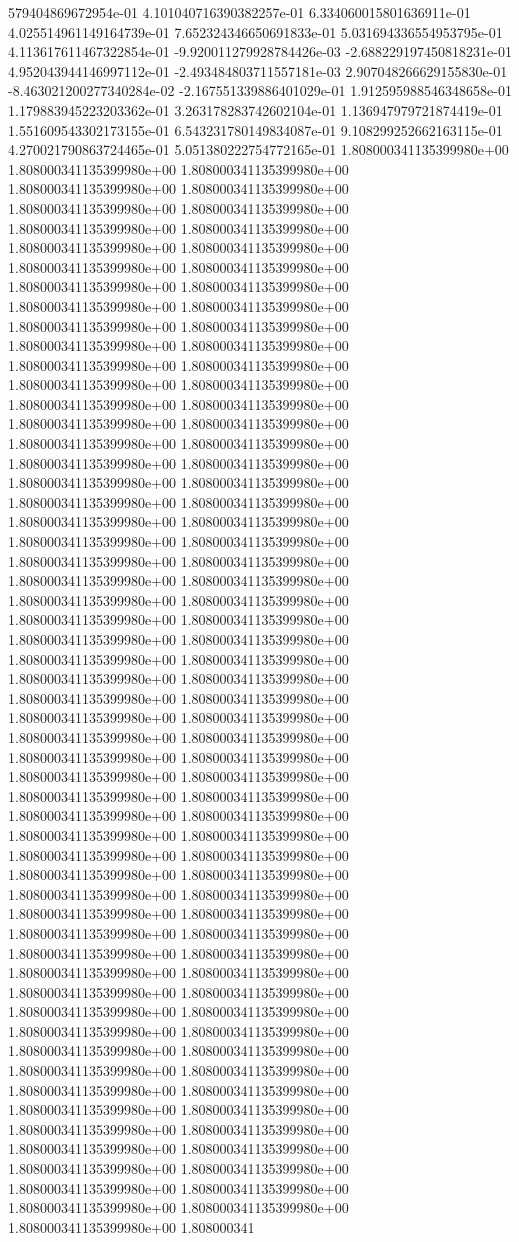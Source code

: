 579404869672954e-01	4.101040716390382257e-01	6.334060015801636911e-01	4.025514961149164739e-01	7.652324346650691833e-01	5.031694336554953795e-01	4.113617611467322854e-01	-9.920011279928784426e-03	-2.688229197450818231e-01	4.952043944146997112e-01	-2.493484803711557181e-03	2.907048266629155830e-01	-8.463021200277340284e-02	-2.167551339886401029e-01	1.912595988546348658e-01	1.179883945223203362e-01	3.263178283742602104e-01	1.136947979721874419e-01	1.551609543302173155e-01	6.543231780149834087e-01	9.108299252662163115e-01	4.270021790863724465e-01	5.051380222754772165e-01
1.808000341135399980e+00	1.808000341135399980e+00	1.808000341135399980e+00	1.808000341135399980e+00	1.808000341135399980e+00	1.808000341135399980e+00	1.808000341135399980e+00	1.808000341135399980e+00	1.808000341135399980e+00	1.808000341135399980e+00	1.808000341135399980e+00	1.808000341135399980e+00	1.808000341135399980e+00	1.808000341135399980e+00	1.808000341135399980e+00	1.808000341135399980e+00	1.808000341135399980e+00	1.808000341135399980e+00	1.808000341135399980e+00	1.808000341135399980e+00	1.808000341135399980e+00	1.808000341135399980e+00	1.808000341135399980e+00	1.808000341135399980e+00	1.808000341135399980e+00	1.808000341135399980e+00	1.808000341135399980e+00	1.808000341135399980e+00	1.808000341135399980e+00	1.808000341135399980e+00	1.808000341135399980e+00	1.808000341135399980e+00	1.808000341135399980e+00	1.808000341135399980e+00	1.808000341135399980e+00	1.808000341135399980e+00	1.808000341135399980e+00	1.808000341135399980e+00	1.808000341135399980e+00	1.808000341135399980e+00	1.808000341135399980e+00	1.808000341135399980e+00	1.808000341135399980e+00	1.808000341135399980e+00	1.808000341135399980e+00	1.808000341135399980e+00	1.808000341135399980e+00	1.808000341135399980e+00	1.808000341135399980e+00	1.808000341135399980e+00	1.808000341135399980e+00	1.808000341135399980e+00	1.808000341135399980e+00	1.808000341135399980e+00	1.808000341135399980e+00	1.808000341135399980e+00	1.808000341135399980e+00	1.808000341135399980e+00	1.808000341135399980e+00	1.808000341135399980e+00	1.808000341135399980e+00	1.808000341135399980e+00	1.808000341135399980e+00	1.808000341135399980e+00	1.808000341135399980e+00	1.808000341135399980e+00	1.808000341135399980e+00	1.808000341135399980e+00	1.808000341135399980e+00	1.808000341135399980e+00	1.808000341135399980e+00	1.808000341135399980e+00	1.808000341135399980e+00	1.808000341135399980e+00	1.808000341135399980e+00	1.808000341135399980e+00	1.808000341135399980e+00	1.808000341135399980e+00	1.808000341135399980e+00	1.808000341135399980e+00	1.808000341135399980e+00	1.808000341135399980e+00	1.808000341135399980e+00	1.808000341135399980e+00	1.808000341135399980e+00	1.808000341135399980e+00	1.808000341135399980e+00	1.808000341135399980e+00	1.808000341135399980e+00	1.808000341135399980e+00	1.808000341135399980e+00	1.808000341135399980e+00	1.808000341135399980e+00	1.808000341135399980e+00	1.808000341135399980e+00	1.808000341135399980e+00	1.808000341135399980e+00	1.808000341135399980e+00	1.808000341135399980e+00	1.808000341135399980e+00	1.808000341135399980e+00	1.808000341135399980e+00	1.808000341135399980e+00	1.808000341135399980e+00	1.808000341135399980e+00	1.808000341135399980e+00	1.808000341135399980e+00	1.808000341135399980e+00	1.808000341135399980e+00	1.808000341135399980e+00	1.808000341